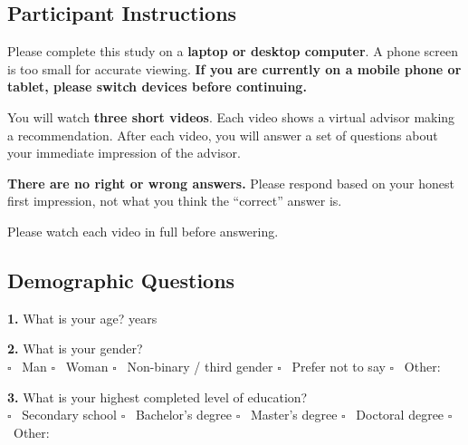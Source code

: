 \documentclass[11pt, a4paper]{article}
\begin{document}
\subsection{Participant Instructions}

\begin{infobox}
\small
Please complete this study on a \textbf{laptop or desktop computer}. A phone screen is too small for accurate viewing. \textbf{If you are currently on a mobile phone or tablet, please switch devices before continuing.}

You will watch \textbf{three short videos}. Each video shows a virtual advisor making a recommendation. After each video, you will answer a set of questions about your immediate impression of the advisor.

\textbf{There are no right or wrong answers.} Please respond based on your honest first impression, not what you think the ``correct'' answer is.

Please watch each video in full before answering.
\end{infobox}

\vspace{12pt}

\subsection{Demographic Questions}

\vspace{6pt}

\noindent\textbf{1.} What is your age? \quad \underline{\hspace{3cm}} years

\vspace{8pt}
\noindent\textbf{2.} What is your gender?\\[4pt]
$\square$ \ Man \quad $\square$ \ Woman \quad $\square$ \ Non-binary / third gender \quad $\square$ \ Prefer not to say \quad $\square$ \ Other: \underline{\hspace{2cm}}

\vspace{8pt}
\noindent\textbf{3.} What is your highest completed level of education?\\[4pt]
$\square$ \ Secondary school \quad $\square$ \ Bachelor's degree \quad $\square$ \ Master's degree \quad $\square$ \ Doctoral degree \quad $\square$ \ Other: \underline{\hspace{2cm}}
\end{document}
